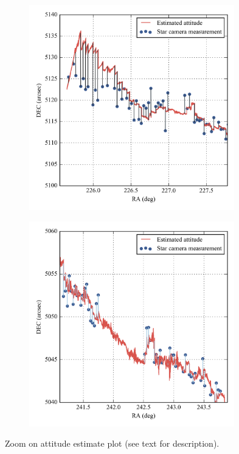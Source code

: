 \begin{figure}[!h]
\begin{subfigure}[b]{0.5\textwidth}
		\centering
		\includegraphics[width=0.98\textwidth]{Figures/attitude_estimate_zoom1.png} 
		\caption{}
		\label{subfig:attitudeEstimateZoom1}
\end{subfigure}
\begin{subfigure}[b]{0.5\textwidth}
		\centering
		\includegraphics[width=0.98\textwidth]{Figures/attitude_estimate_zoom2.png} 
		\caption{}
		\label{subfig:attitudeEstimateZoom2}
\end{subfigure}
\label{fig:AttitudeEstimateZoom}
\caption[Zoom on attitude estimate plot]{Zoom on attitude estimate plot (see text for description).}
\end{figure}

